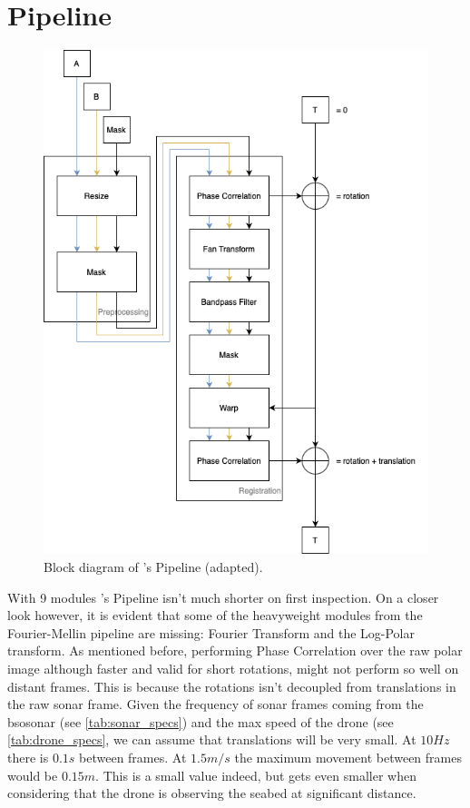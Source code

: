 \section{\citeauthor{Hurtos2015} Pipeline \cite{Hurtos2015}}
\begin{figure}[H] 
  \centering
  \includegraphics[width=.7\textwidth]{figures/reddy_pipeline.png}
  \caption{Block diagram of \citeauthor{Hurtos2015}'s Pipeline (adapted).}
  \label{fig:pcpipeline}
\end{figure}

With 9 modules \citeauthor{Hurtos2015}'s Pipeline isn't much shorter on first inspection. On a closer look however, it is evident that some of the heavyweight modules from the Fourier-Mellin pipeline are missing: Fourier Transform and the Log-Polar transform. As mentioned before, performing Phase Correlation over the raw polar image although faster and valid for short rotations, might not perform so well on distant frames. This is because the rotations isn't decoupled from translations in the raw sonar frame. Given the frequency of sonar frames coming from the \acrshort{bsosonar} (see \autoref{tab:sonar_specs}) and the max speed of the drone (see \autoref{tab:drone_specs}, we can assume that translations will be very small. At \(10Hz\) there is \(0.1s\) between frames. At \(1.5m/s\) the maximum movement between frames would be \(0.15m\). This is a small value indeed, but gets even smaller when considering that the drone is observing the seabed at significant distance. 

